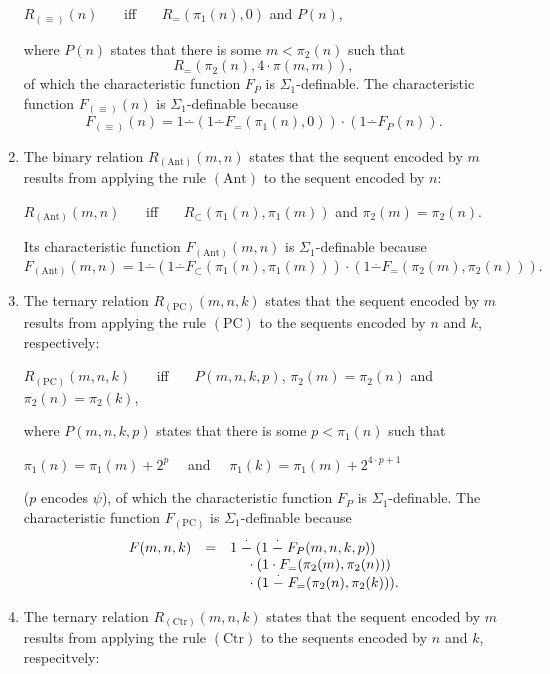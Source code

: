 \documentclass[leqno]{report}
\newcommand{\ant}{{(\mathrm{Ant})}}
\newcommand{\pc}{{(\mathrm{PC})}}
\newcommand{\ctr}{{(\mathrm{Ctr})}}
\newcommand{\eq}{{(\equiv)}}
\begin{document}
\begin{enumerate}[1.]
\begin{center}
$R_\eq (n)$ \ \ \ iff \ \ \ $R_= (\pi_1 (n), 0)$ and $P(n)$,
\end{center}
where $P(n)$ states that there is some $m < \pi_2 (n)$ such that
\[
R_= (\pi_2 (n), 4 \cdot \pi (m, m)),
\]
of which the characteristic function $F_P$ is $\Sigma_1$-definable. The characteristic function $F_\eq (n)$ is $\Sigma_1$-definable because
\[
F_\eq (n) = 1 \stackrel{.}{-} (1 \stackrel{.}{-} F_= (\pi_1 (n), 0)) \cdot (1 \stackrel{.}{-} F_P(n)).
\]
%
\item The binary relation $R_\ant (m, n)$ states that the sequent encoded by $m$ results from applying the rule $\ant$ to the sequent encoded by $n$:
\begin{center}
$R_\ant (m, n)$ \ \ \ iff \ \ \ $R_\subset (\pi_1 (n), \pi_1 (m))$ and $\pi_2 (m) = \pi_2 (n)$.
\end{center}
Its characteristic function $F_\ant (m, n)$ is $\Sigma_1$-definable because
\[
F_\ant (m, n) = 1 \stackrel{.}{-} (1 \stackrel{.}{-} F_\subset (\pi_1 (n), \pi_1 (m))) \cdot (1 \stackrel{.}{-} F_=(\pi_2 (m), \pi_2 (n))).
\]  
%
\item The ternary relation $R_\pc (m, n, k)$ states that the sequent encoded by $m$ results from applying the rule $\pc$ to the sequents encoded by $n$ and $k$, respectively:
\begin{center}
$R_\pc (m, n, k)$ \ \ \ iff \ \ \ $P (m, n, k, p)$, $\pi_2 (m) = \pi_2 (n)$ and $\pi_2 (n) = \pi_2 (k)$,
\end{center}
where $P (m, n, k, p)$ states that there is some $p < \pi_1 (n)$ such that
\begin{center}
$\pi_1 (n) = \pi_1 (m) + 2^p$ \ \ and \ \ $\pi_1 (k) = \pi_1 (m) + 2^{4 \cdot p + 1}$
\end{center}
($p$ encodes $\psi$), of which the characteristic function $F_P$ is $\Sigma_1$-definable. The characteristic function $F_\pc$ is $\Sigma_1$-definable because
\[
\begin{array}{lll}
F (m, n, k) & = & 1 \stackrel{.}{-} (1 \stackrel{.}{-} F_P(m, n, k, p))\cr
\ & \ & \ \ \phantom{1} \cdot (1 \cdot F_=(\pi_2 (m), \pi_2 (n)))\cr
\ & \ & \ \ \phantom{1} \cdot (1 \stackrel{.}{-} F_=(\pi_2 (n), \pi_2 (k))).
\end{array}
\]
%
\item The ternary relation $R_\ctr (m, n, k)$ states that the sequent encoded by $m$ results from applying the rule $\ctr$ to the sequents encoded by $n$ and $k$, respecitvely:
\begin{center}

\end{center}
\end{enumerate}
\end{document}
